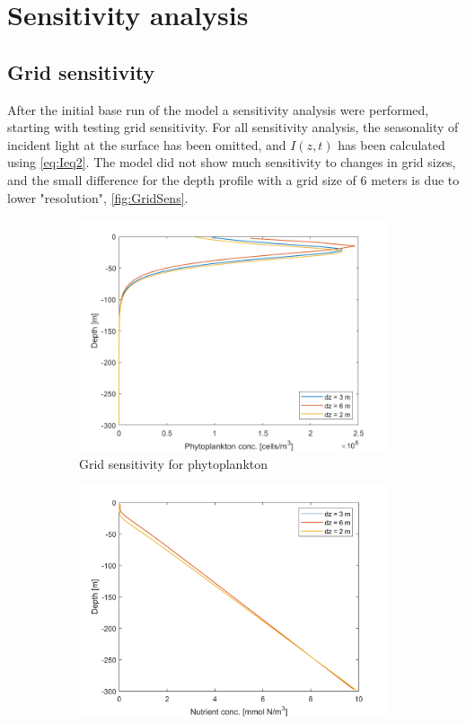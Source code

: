 \newpage
\section{Sensitivity analysis}
\subsection{Grid sensitivity}
After the initial base run of the model a sensitivity analysis were performed, starting with testing grid sensitivity. For all sensitivity analysis, the seasonality of incident light at the surface has been omitted, and $I(z,t)$ has been calculated using \cref{eq:Ieq2}. The model did not show much sensitivity to changes in grid sizes, and the small difference for the depth profile with a grid size of 6 meters is due to lower "resolution", \cref{fig:GridSens}.      
\begin{figure}[h]
\centering
\begin{subfigure}{.5\textwidth}
  \centering
  \includegraphics[width=\linewidth]{Pictures/Gridsensitivity.png}
  \caption{Grid sensitivity for phytoplankton}
  \label{fig:PGridSens}
\end{subfigure}%
\begin{subfigure}{.5\textwidth}
  \centering
  \includegraphics[width=\linewidth]{Pictures/GridsensitivityN.png}

\end{subfigure}
\end{figure}
